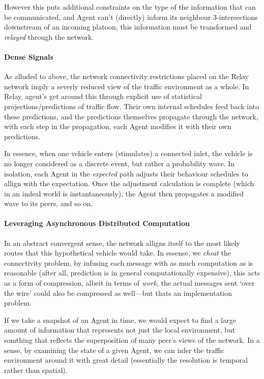 \documentclass{report}
\begin{document}
However this puts additional constraints on the type of the information that can be communicated, and Agent can't (directly) inform its neighbour 3-intersections downstream of an incoming platoon, this information must be transformed and \emph{relayed} through the network.

\paragraph{Dense Signals}
As alluded to above, the network connectivity restrictions placed on the Relay network imply a severly reduced view of the traffic environment as a whole.
In Relay, agent's get around this through explicit use of statistical projections/predictions of traffic flow.
Their own internal schedules feed back into these predictions, and the predictions themselves propagate through the network, with each step in the propagation, each Agent modifies it with their own predictions.

In essence, when one vehicle enters (stimulates) a connected inlet, the vehicle is no longer considered as a discrete event, but rather a probability wave. 
In isolation, each Agent in the \emph{expected} path adjusts their behaviour schedules to allign with the expectation.
Once the adjustment calculation is complete (which in an indeal world is instantaneously), the Agent then propagates a modified wave to its peers, and so on.

\paragraph{Leveraging Asynchronous Distributed Computation}
In an abstract convergent sense, the network alligns itself to the most likely routes that this hypothetical vehicle would take.
In essense, we \emph{cheat} the connectivity problem, by infusing each message with as much computation as is reasonable (after all, prediction is in general computationally expensive), this acts as a form of compression, albeit in terms of \emph{work}, the actual messages sent `over the wire' could also be compressed as well---but thats an implementation problem.

If we take a snapshot of an Agent in time, we would expect to find a large amount of information that represents not just the local environment, but somthing that reflects the superposition of many peer's views of the network.
In a sense, by examining the state of a given Agent, we can infer the traffic environment around it with great detail (essentially the resolution is temporal rather than spatial).
\end{document}
